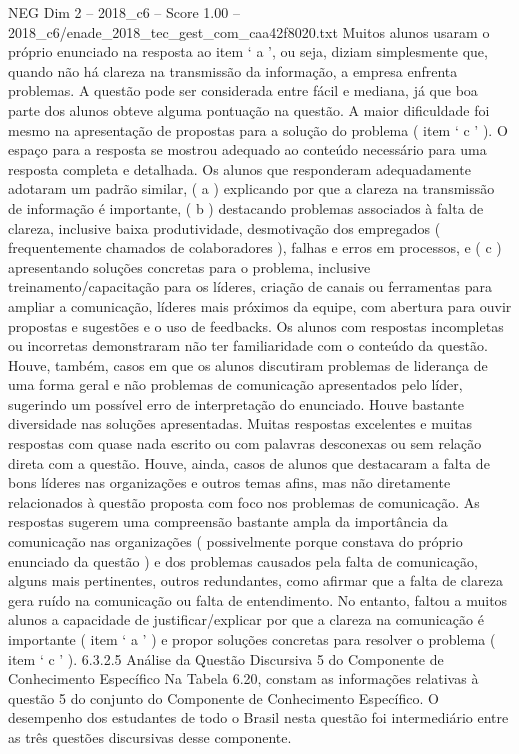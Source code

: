 \begin{textsample}{NEG Dim 2 – 2018\_c6 – Score 1.00 – 2018\_c6/enade\_2018\_tec\_gest\_com\_caa42f8020.txt}
Muitos alunos usaram o próprio enunciado na resposta ao item ‘ a ’, ou seja, diziam simplesmente que, quando não há clareza na transmissão da informação, a empresa enfrenta problemas.
A questão pode ser considerada entre fácil e mediana, já que boa parte dos alunos obteve alguma pontuação na questão.
A maior dificuldade foi mesmo na apresentação de propostas para a solução do problema ( item ‘ c ’ ).
O espaço para a resposta se mostrou adequado ao conteúdo necessário para uma resposta completa e detalhada.
Os alunos que responderam adequadamente adotaram um padrão similar, ( a ) explicando por que a clareza na transmissão de informação é importante, ( b ) destacando problemas associados à falta de clareza, inclusive baixa produtividade, desmotivação dos empregados ( frequentemente chamados de colaboradores ), falhas e erros em processos, e ( c ) apresentando soluções concretas para o problema, inclusive treinamento/capacitação para os líderes, criação de canais ou ferramentas para ampliar a comunicação, líderes mais próximos da equipe, com abertura para ouvir propostas e sugestões e o uso de feedbacks.
Os alunos com respostas incompletas ou incorretas demonstraram não ter familiaridade com o conteúdo da questão.
Houve, também, casos em que os alunos discutiram problemas de liderança de uma forma geral e não problemas de comunicação apresentados pelo líder, sugerindo um possível erro de interpretação do enunciado.
Houve bastante diversidade nas soluções apresentadas.
Muitas respostas excelentes e muitas respostas com quase nada escrito ou com palavras desconexas ou sem relação direta com a questão.
Houve, ainda, casos de alunos que destacaram a falta de bons líderes nas organizações e outros temas afins, mas não diretamente relacionados à questão proposta com foco nos problemas de comunicação.
As respostas sugerem uma compreensão bastante ampla da importância da comunicação nas organizações ( possivelmente porque constava do próprio enunciado da questão ) e dos problemas causados pela falta de comunicação, alguns mais pertinentes, outros redundantes, como afirmar que a falta de clareza gera ruído na comunicação ou falta de entendimento.
No entanto, faltou a muitos alunos a capacidade de justificar/explicar por que a clareza na comunicação é importante ( item ‘ a ’ ) e propor soluções concretas para resolver o problema ( item ‘ c ’ ). 6.3.2.5 Análise da Questão Discursiva 5 do Componente de Conhecimento Específico Na Tabela 6.20, constam as informações relativas à questão 5 do conjunto do Componente de Conhecimento Específico.
O desempenho dos estudantes de todo o Brasil nesta questão foi intermediário entre as três questões discursivas desse componente.

\end{textsample}
